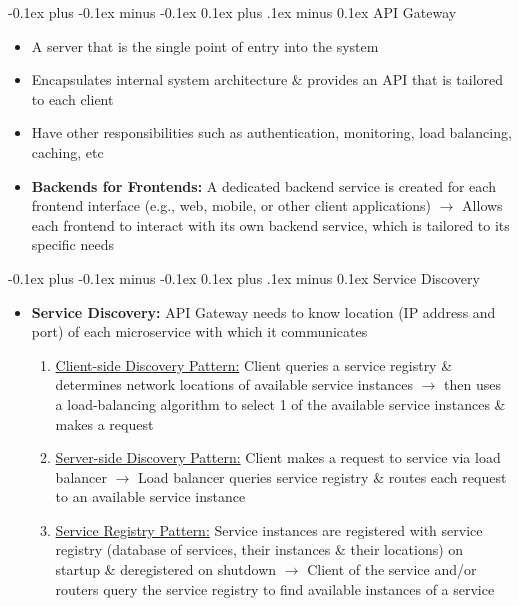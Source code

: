 \documentclass[landscape]{article}
\makeatletter
\renewcommand{\subsection}{\@startsection{subsection}{2}{0mm}%
  {-0.1ex plus -0.1ex minus -0.1ex}%
  {0.1ex plus .1ex minus 0.1ex}%
{\normalfont\scriptsize\bfseries}}
\makeatother
\begin{document}
\begin{multicols*}{5}
    \subsection{API Gateway}
    \begin{itemize}
      \item A server that is the single point of entry into the system
      \item Encapsulates internal system architecture \& provides an API that is tailored to each client
      \item Have other responsibilities such as authentication, monitoring, load balancing, caching, etc
      \item \textbf{Backends for Frontends:} A dedicated backend service is created for each frontend interface (e.g., web, mobile, or other client applications) $\rightarrow$ Allows each frontend to interact with its own backend service, which is tailored to its specific needs
    \end{itemize}

    \subsection{Service Discovery}
    \begin{itemize}
      \item \textbf{Service Discovery:} API Gateway needs to know location (IP address and port) of each microservice with which it communicates
      \begin{enumerate}
        \item \underline{Client-side Discovery Pattern:} Client queries a service registry \& determines network locations of available service instances $\rightarrow$ then uses a load-balancing algorithm to select 1 of the available service instances \& makes a request
        \item \underline{Server-side Discovery Pattern:} Client makes a request to service via load balancer $\rightarrow$ Load balancer queries service registry \& routes each request to an available service instance
        \item \underline{Service Registry Pattern:} Service instances are registered with service registry (database of services, their instances \& their locations) on startup \& deregistered on shutdown $\rightarrow$ Client of the service and/or routers query the service registry to find available instances of a service
      \end{enumerate}
    \end{itemize}


\end{multicols*}
\end{document}
